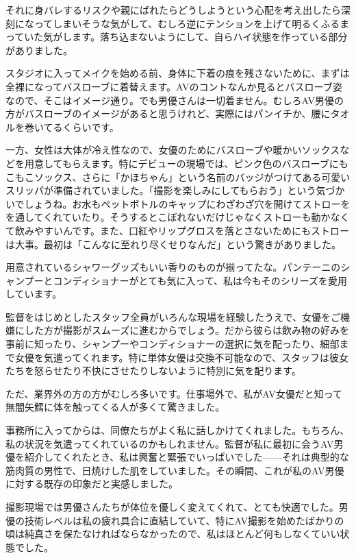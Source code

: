 \documentclass[12pt,UTF8]{ctexbook}
\begin{document}
それに身バレするリスクや親にばれたらどうしようという心配を考え出したら深刻になってしまいそうな気がして、むしろ逆にテンションを上げて明るくふるまっていた気がします。落ち込まないようにして、自らハイ状態を作っている部分がありました。

スタジオに入ってメイクを始める前、身体に下着の痕を残さないために、まずは全裸になってバスローブに着替えます。AVのコントなんか見るとバスローブ姿なので、そこはイメージ通り。でも男優さんは一切着ません。むしろAV男優の方がバスローブのイメージがあると思うけれど、実際にはパンイチか、腰にタオルを巻いてるくらいです。

一方、女性は大体が冷え性なので、女優のためにバスローブや暖かいソックスなどを用意してもらえます。特にデビューの現場では、ピンク色のバスローブにもこもこソックス、さらに「かほちゃん」という名前のバッジがつけてある可愛いスリッパが準備されていました。「撮影を楽しみにしてもらおう」という気づかいでしょうね。お水もペットボトルのキャップにわざわざ穴を開けてストローをを通してくれていたり。そうするとこぼれないだけじゃなくストローも動かなくて飲みやすいんです。また、口紅やリップグロスを落とさないためにもストローは大事。最初は「こんなに至れり尽くせりなんだ」という驚きがありました。

用意されているシャワーグッズもいい香りのものが揃ってたな。パンテーニのシャンプーとコンディショナーがとても気に入って、私は今もそのシリーズを愛用しています。

監督をはじめとしたスタッフ全員がいろんな現場を経験したうえで、女優をご機嫌にした方が撮影がスムーズに進むからでしょう。だから彼らは飲み物の好みを事前に知ったり、シャンプーやコンディショナーの選択に気を配ったり、細部まで女優を気遣ってくれます。特に単体女優は交換不可能なので、スタッフは彼女たちを怒らせたり不快にさせたりしないように特別に気を配ります。

ただ、業界外の方の方がむしろ多いです。仕事場外で、私がAV女優だと知って無闇矢鱈に体を触ってくる人が多くて驚きました。

事務所に入ってからは、同僚たちがよく私に話しかけてくれました。もちろん、私の状況を気遣ってくれているのかもしれません。監督が私に最初に会うAV男優を紹介してくれたとき、私は興奮と緊張でいっぱいでした——それは典型的な筋肉質の男性で、日焼けした肌をしていました。その瞬間、これが私のAV男優に対する既存の印象だと実感しました。

撮影現場では男優さんたちが体位を優しく変えてくれて、とても快適でした。男優の技術レベルは私の疲れ具合に直結していて、特にAV撮影を始めたばかりの頃は純真さを保たなければならなかったので、私はほとんど何もしなくていい状態でした。
\end{document}
